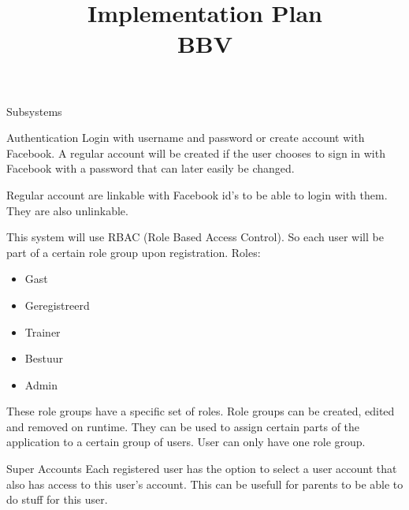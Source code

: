 \documentclass[10pt,a4paper]{article}
\title{
    Implementation Plan \\
    BBV
}
\begin{document}
\maketitle

\begin{section}{Subsystems}
    \begin{subsection}{Authentication}
        Login with username and password or create account with Facebook. A regular
        account will be created if the user chooses to sign in with Facebook with a
        password that can later easily be changed.
        
        Regular account are linkable with Facebook id's to be able to login with them.
        They are also unlinkable.
        
        This system will use RBAC (Role Based Access Control). So each user will
        be part of a certain role group upon registration.
        Roles:
        \begin{itemize}
            \item Gast
            \item Geregistreerd
            \item Trainer
            \item Bestuur
            \item Admin
        \end{itemize}
        These role groups have a specific set of roles.
        Role groups can be created, edited and removed on runtime. They can be used to
        assign certain parts of the application to a certain group of users.
        User can only have one role group.
    \end{subsection}
    
    \begin{subsection}{Super Accounts}
        Each registered user has the option to select a user account that also has access
        to this user's account. This can be usefull for parents to be able to do stuff
        for this user.
    \end{subsection}
    

\end{section}
\end{document}
